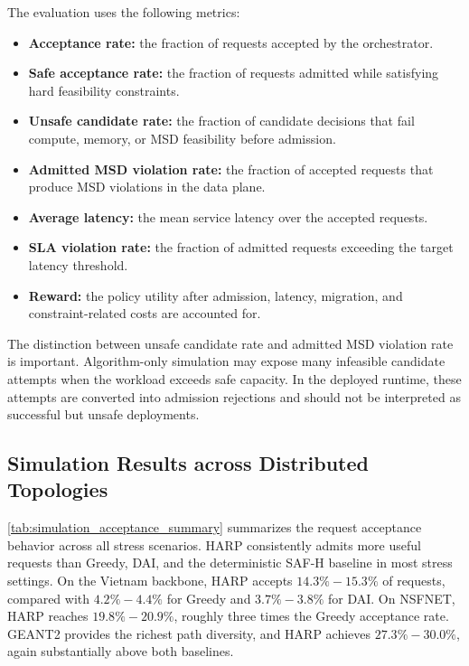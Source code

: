 \documentclass[final,5p]{elsarticle}
\begin{document}
The evaluation uses the following metrics:
\begin{itemize}
    \item \textbf{Acceptance rate:} the fraction of requests accepted by the orchestrator.
    \item \textbf{Safe acceptance rate:} the fraction of requests admitted while satisfying hard feasibility constraints.
    \item \textbf{Unsafe candidate rate:} the fraction of candidate decisions that fail compute, memory, or MSD feasibility before admission.
    \item \textbf{Admitted MSD violation rate:} the fraction of accepted requests that produce MSD violations in the data plane.
    \item \textbf{Average latency:} the mean service latency over the accepted requests.
    \item \textbf{SLA violation rate:} the fraction of admitted requests exceeding the target latency threshold.
    \item \textbf{Reward:} the policy utility after admission, latency, migration, and constraint-related costs are accounted for.
\end{itemize}

The distinction between unsafe candidate rate and admitted MSD violation rate is important. Algorithm-only simulation may expose many infeasible candidate attempts when the workload exceeds safe capacity. In the deployed runtime, these attempts are converted into admission rejections and should not be interpreted as successful but unsafe deployments.

\subsection{Simulation Results across Distributed Topologies}
\label{subsec:simulation_results}

\autoref{tab:simulation_acceptance_summary} summarizes the request acceptance behavior across all stress scenarios. HARP consistently admits more useful requests than Greedy, DAI, and the deterministic SAF-H baseline in most stress settings. On the Vietnam backbone, HARP accepts \(14.3\% - 15.3\%\) of requests, compared with \(4.2\% - 4.4\%\) for Greedy and \(3.7\% - 3.8\%\) for DAI. On NSFNET, HARP reaches \(19.8\%-20.9\%\), roughly three times the Greedy acceptance rate. GEANT2 provides the richest path diversity, and HARP achieves \(27.3\%-30.0\%\), again substantially above both baselines.
\end{document}
